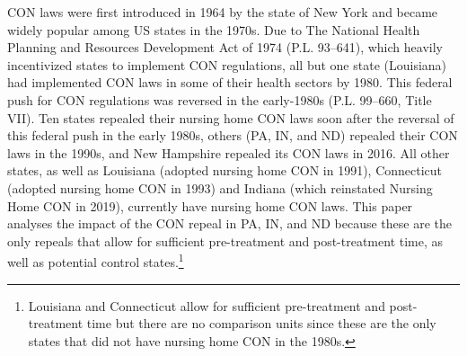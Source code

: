 \documentclass[../Main.tex]{subfiles}
\begin{document}
CON laws were first introduced in 1964 by the state of New York and became widely popular among US states in the 1970s. Due to The National Health Planning and Resources Development Act of 1974 (P.L. 93–641), which heavily incentivized states to implement CON regulations, all but one state (Louisiana) had implemented CON laws in some of their health sectors by 1980. This federal push for CON regulations was reversed in the early-1980s (P.L. 99–660, Title VII). Ten states repealed their nursing home CON laws soon after the reversal of this federal push in the early 1980s, others (PA, IN, and ND) repealed their CON laws in the 1990s, and New Hampshire repealed its CON laws in 2016. All other states, as well as Louisiana (adopted nursing home CON in 1991), Connecticut (adopted nursing home CON in 1993) and Indiana (which reinstated Nursing Home CON in 2019), currently have nursing home CON laws. This paper analyses the impact of the CON repeal in PA, IN, and ND because these are the only repeals that allow for sufficient pre-treatment and post-treatment time, as well as potential control states.\footnote{Louisiana and Connecticut allow for sufficient pre-treatment and post-treatment time but there are no comparison units since these are the only states that did not have nursing home CON in the 1980s.}
\end{document}
